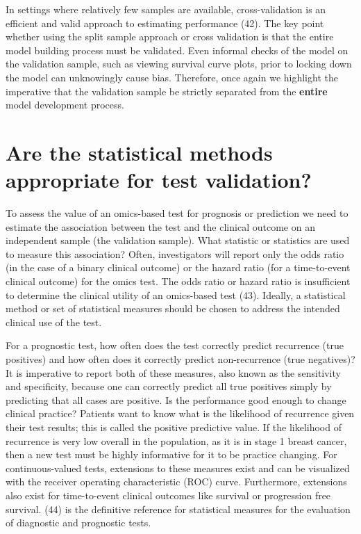 \documentclass[11pt]{article}
\begin{document}
In settings where relatively few samples are available, cross-validation
is an efficient and valid approach to estimating performance (42). The
key point whether using the split sample approach or cross validation is
that the entire model building process must be validated. Even informal
checks of the model on the validation sample, such as viewing survival
curve plots, prior to locking down the model can unknowingly cause bias.
Therefore, once again we highlight the imperative that the validation
sample be strictly separated from the \textbf{entire} model development
process.

\section{Are the statistical methods appropriate for test
validation?}\label{are-the-statistical-methods-appropriate-for-test-validation}

To assess the value of an omics-based test for prognosis or prediction
we need to estimate the association between the test and the clinical
outcome on an independent sample (the validation sample). What statistic
or statistics are used to measure this association? Often, investigators
will report only the odds ratio (in the case of a binary clinical
outcome) or the hazard ratio (for a time-to-event clinical outcome) for
the omics test. The odds ratio or hazard ratio is insufficient to
determine the clinical utility of an omics-based test (43). Ideally, a
statistical method or set of statistical measures should be chosen to
address the intended clinical use of the test.

For a prognostic test, how often does the test correctly predict
recurrence (true positives) and how often does it correctly predict
non-recurrence (true negatives)? It is imperative to report both of
these measures, also known as the sensitivity and specificity, because
one can correctly predict all true positives simply by predicting that
all cases are positive. Is the performance good enough to change
clinical practice? Patients want to know what is the likelihood of
recurrence given their test results; this is called the positive
predictive value. If the likelihood of recurrence is very low overall in
the population, as it is in stage 1 breast cancer, then a new test must
be highly informative for it to be practice changing. For
continuous-valued tests, extensions to these measures exist and can be
visualized with the receiver operating characteristic (ROC) curve.
Furthermore, extensions also exist for time-to-event clinical outcomes
like survival or progression free survival. (44) is the definitive
reference for statistical measures for the evaluation of diagnostic and
prognostic tests.
\end{document}
